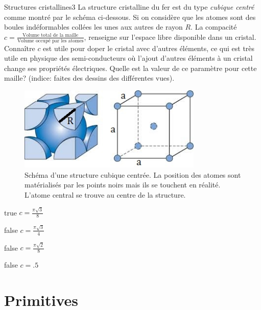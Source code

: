 \documentclass[11pt]{article}
\begin{document}
        \begin{question}{31}{Structures cristallines}{3}{}
            La structure cristalline du fer est du type \emph{cubique centré} comme montré par le schéma ci-dessous. Si on considère que les atomes sont des boules indéformables collées les unes aux autres de rayon $R$. La compacité $c = \frac{\text{Volume total de la maille}}{\text{Volume occupé par les atomes}}$, renseigne sur l'espace libre disponible dans un cristal. Connaître $c$ est utile pour doper le cristal avec d'autres éléments, ce qui est très utile en physique des semi-conducteurs où l'ajout d'autres éléments à un cristal change ses propriétés électriques. Quelle est la valeur de ce paramètre pour cette maille? (indice: faites des dessins des différentes vues).
            \begin{figure}
                \centering
                \includegraphics[height = 4cm]{Antoine/Figures_Antoine/BCC.png}
                \caption{Schéma d'une structure cubique centrée. La position des atomes sont matérialisés par les points noirs mais ils se touchent en réalité. L'atome central se trouve au centre de la structure.}
            \end{figure}
        \end{question}
        \begin{reponses} 
            \item[true] $c = \frac{\pi\sqrt{3}}{8}$
            \item[false] $c = \frac{\pi\sqrt{3}}{4}$
            \item[false] $c = \frac{\pi\sqrt{2}}{8}$
    	    \item[false] $c = \num{.5}$
        \end{reponses}
        
        
        \section{Primitives}
        
        
\end{document}
